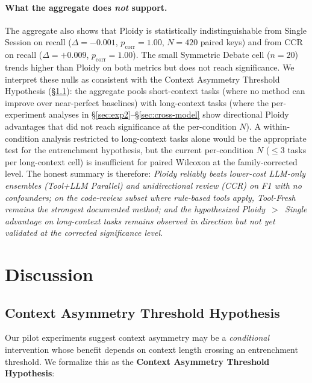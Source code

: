 \documentclass[11pt]{article}
\begin{document}
\paragraph{What the aggregate does \emph{not} support.} The aggregate also shows that Ploidy is statistically indistinguishable from Single Session on recall ($\Delta = -0.001$, $p_\text{corr} = 1.00$, $N = 420$ paired keys) and from CCR on recall ($\Delta = +0.009$, $p_\text{corr} = 1.00$). The small Symmetric Debate cell ($n = 20$) trends higher than Ploidy on both metrics but does not reach significance. We interpret these nulls as consistent with the Context Asymmetry Threshold Hypothesis (\S\ref{sec:threshold}): the aggregate pools short-context tasks (where no method can improve over near-perfect baselines) with long-context tasks (where the per-experiment analyses in \S\ref{sec:exp2}--\S\ref{sec:cross-model} show directional Ploidy advantages that did not reach significance at the per-condition $N$). A within-condition analysis restricted to long-context tasks alone would be the appropriate test for the entrenchment hypothesis, but the current per-condition $N$ ($\leq$3 tasks per long-context cell) is insufficient for paired Wilcoxon at the family-corrected level. The honest summary is therefore: \emph{Ploidy reliably beats lower-cost LLM-only ensembles (Tool+LLM Parallel) and unidirectional review (CCR) on F1 with no confounders; on the code-review subset where rule-based tools apply, Tool-Fresh remains the strongest documented method; and the hypothesized Ploidy~$>$~Single advantage on long-context tasks remains observed in direction but not yet validated at the corrected significance level}.

\section{Discussion}
\label{sec:discussion}

\subsection{Context Asymmetry Threshold Hypothesis}
\label{sec:threshold}

Our pilot experiments suggest context asymmetry may be a \emph{conditional} intervention whose benefit depends on context length crossing an entrenchment threshold. We formalize this as the \textbf{Context Asymmetry Threshold Hypothesis}:
\end{document}
